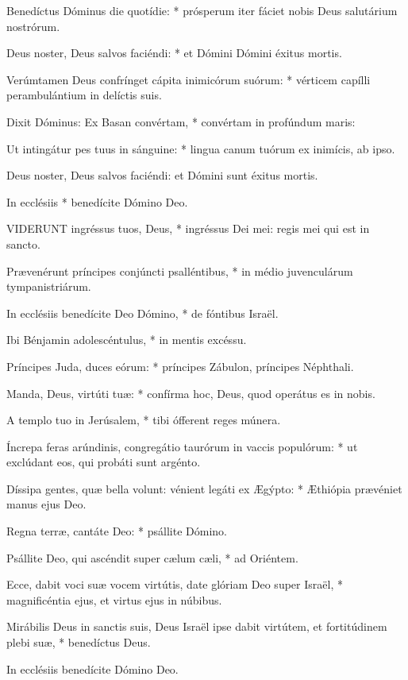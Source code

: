 Benedíctus Dóminus die quotídie: * prósperum iter fáciet nobis Deus salutárium nostrórum.

Deus noster, Deus salvos faciéndi: * et Dómini Dómini éxitus mortis.

Verúmtamen Deus confrínget cápita inimicórum suórum: * vérticem capílli perambulántium in delíctis suis.

Dixit Dóminus: Ex Basan convértam, * convértam in profúndum maris:

Ut intingátur pes tuus in sánguine: * lingua canum tuórum ex inimícis, ab ipso.

 Deus noster, Deus salvos faciéndi: et Dómini sunt éxitus mortis.

 In ecclésiis * benedícite Dómino Deo.


\lettrine[lines=2]{V}{IDERUNT} ingréssus tuos, Deus, * ingréssus Dei mei: regis mei qui est in sancto.

Prævenérunt príncipes conjúncti psalléntibus, * in médio juvenculárum tympanistriárum.

In ecclésiis benedícite Deo Dómino, * de fóntibus Israël.

Ibi Bénjamin adolescéntulus, * in mentis excéssu.

Príncipes Juda, duces eórum: * príncipes Zábulon, príncipes Néphthali.

Manda, Deus, virtúti tuæ: * confírma hoc, Deus, quod operátus es in nobis.

A templo tuo in Jerúsalem, * tibi ófferent reges múnera.

Íncrepa feras arúndinis, congregátio taurórum in vaccis populórum: * ut exclúdant eos, qui probáti sunt argénto.

Díssipa gentes, quæ bella volunt: vénient legáti ex Ægýpto: * Æthiópia prævéniet manus ejus Deo.

Regna terræ, cantáte Deo: * psállite Dómino.

Psállite Deo, qui ascéndit super cælum cæli, * ad Oriéntem.

Ecce, dabit voci suæ vocem virtútis, date glóriam Deo super Israël, * magnificéntia ejus, et virtus ejus in núbibus.

Mirábilis Deus in sanctis suis, Deus Israël ipse dabit virtútem, et fortitúdinem plebi suæ, * benedíctus Deus.

 In ecclésiis benedícite Dómino Deo.


